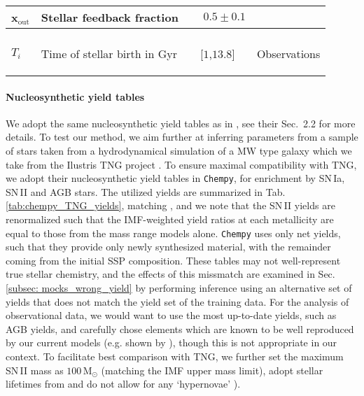 \documentclass{aa}
\begin{document}
\begin{tiny}
\begin{table*}
\begin{minipage}{\textwidth}
\begin{center}
\begin{tabularx}{\textwidth}{ >{\raggedleft}p{2.2cm}p{6.5cm}|c c }
x$_\mathrm{out}$ & Stellar feedback fraction & $\phantom{-}0.5\pm0.1$ & \citep[Tab.\,1]{Rybizki_2017}\\
  
\hline
\multicolumn{4}{c}{$T_i$: \textit{Timescale}}\\
 
\hline
$T_i$ & Time of stellar birth in Gyr & [$1$,$13.8$] & Observations

\label{tab:priors}
\end{tabularx}
\end{center}
\end{minipage}
\end{table*}
\end{tiny}

\paragraph{Nucleosynthetic yield tables}
We adopt the same nucleosynthetic yield tables as in \citep{Philcox_2019}, see their Sec.~2.2 for more details.
To test our method, we aim further at inferring parameters from a sample of stars taken from a hydrodynamical simulation of a MW type galaxy which we take from the Ilustris TNG project \citep{Pillepich2018}. To ensure maximal compatibility with TNG, we adopt their nucleosynthetic yield tables in \texttt{Chempy}, for enrichment by SN\,Ia, SN\,II and AGB stars. The utilized yields are summarized in Tab.\,\ref{tab:chempy_TNG_yields}, matching \citet[Tab.\,2]{2018MNRAS.473.4077P}, and we note that the SN\,II yields are renormalized such that the IMF-weighted yield ratios at each metallicity are equal to those from the \citet{2006ApJ...653.1145K} mass range models alone. \texttt{Chempy} uses only net yields, such that they provide only newly synthesized material, with the remainder coming from the initial SSP composition. These tables may not well-represent true stellar chemistry, and the effects of this missmatch are examined in Sec.\,\ref{subsec: mocks_wrong_yield} by performing inference using an alternative set of yields that does not match the yield set of the training data. For the analysis of observational data, we would want to use the most up-to-date yields, such as \citet{2016ApJ...825...26K} AGB yields, and carefully chose elements which are known to be well reproduced by our current models (e.g. shown by \citet{2019ApJ...874..102W,2019arXiv190806113G}), though this is not appropriate in our context. To facilitate best comparison with TNG, we further set the maximum SN\,II mass as $100\,\mathrm{M}_\odot$ (matching the IMF upper mass limit), adopt stellar lifetimes from \citet{1998A&A...334..505P} and do not allow for any `hypernovae' \citep[in contrary to][]{2018ApJ...861...40P}).
\end{document}
